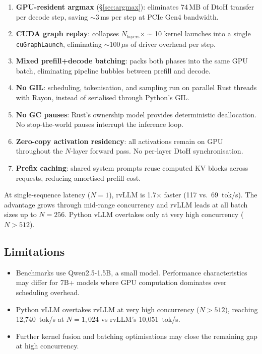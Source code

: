 \documentclass[11pt,a4paper]{article}
\begin{document}
\begin{enumerate}
  \item \textbf{GPU-resident argmax} (\S\ref{sec:argmax}): eliminates 74\,MB of
        DtoH transfer per decode step, saving $\sim$3\,ms per step at PCIe Gen4
        bandwidth.
  \item \textbf{CUDA graph replay}: collapses $N_{\text{layers}} \times \sim$10
        kernel launches into a single \texttt{cuGraphLaunch}, eliminating
        $\sim$100\,$\mu$s of driver overhead per step.
  \item \textbf{Mixed prefill+decode batching}: packs both phases into the same GPU
        batch, eliminating pipeline bubbles between prefill and decode.
  \item \textbf{No GIL}: scheduling, tokenisation, and sampling run on parallel Rust
        threads with Rayon, instead of serialised through Python's GIL.
  \item \textbf{No GC pauses}: Rust's ownership model provides deterministic
        deallocation. No stop-the-world pauses interrupt the inference loop.
  \item \textbf{Zero-copy activation residency}: all activations remain on GPU
        throughout the $N$-layer forward pass. No per-layer DtoH synchronisation.
  \item \textbf{Prefix caching}: shared system prompts reuse computed KV blocks
        across requests, reducing amortised prefill cost.
\end{enumerate}

At single-sequence latency ($N\!=\!1$), rvLLM is 1.7$\times$ faster (117 vs.\ 69~tok/s).
The advantage grows through mid-range concurrency and rvLLM leads at all batch sizes up
to $N\!=\!256$. Python vLLM overtakes only at very high concurrency ($N\!>\!512$).

\subsection{Limitations}

\begin{itemize}
  \item Benchmarks use Qwen2.5-1.5B, a small model. Performance characteristics
        may differ for 7B+ models where GPU computation dominates over scheduling
        overhead.
  \item Python vLLM overtakes rvLLM at very high concurrency ($N\!>\!512$), reaching
        12{,}740~tok/s at $N\!=\!1{,}024$ vs rvLLM's 10{,}051~tok/s.
  \item Further kernel fusion and batching optimisations may close the remaining gap
        at high concurrency.
\end{itemize}
\end{document}
